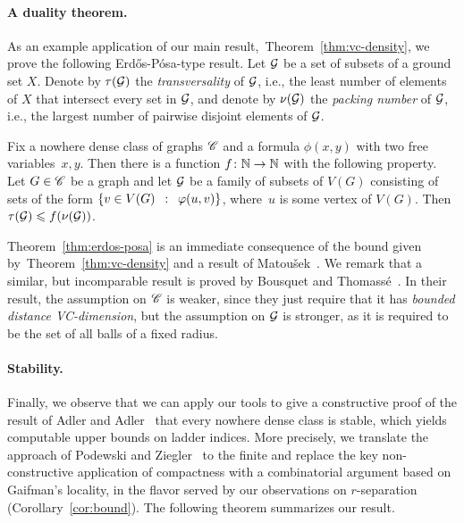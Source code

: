 \paragraph{A duality theorem.}
As an example application of our main
result,~Theorem~\ref{thm:vc-density}, we prove the following
Erd\H{o}s-P\'{o}sa-type result. Let $\cal G$ be a set of subsets of a
ground set $X$. Denote by $\tau(\cal G)$ the \emph{transversality} of
$\cal G$, i.e., the least number of elements of $X$ that intersect
every set in $\cal G$, and denote by $\nu(\cal G)$ the \emph{packing
  number} of $\cal G$, i.e., the largest number of pairwise disjoint
elements of $\cal G$.
 
\setcounter{ep}{\value{theorem}}
\begin{theorem}\label{thm:erdos-posa}
  Fix a nowhere dense class of graphs $\CCC$ and a formula $\phi(x,y)$
  with two free variables~$x,y$.  Then there is a function
  $f\from \N\to\N$ with the following property.  Let $G\in \CCC$ be a
  graph and let $\cal G$ be a family of subsets of $V(G)$ consisting
  of sets of the form $\setof{v\in V(G)}{\phi(u, v)}$, where~$u$ is
  some vertex of $V(G)$.  Then~$\tau({\cal G})\le f(\nu(\cal G))$.
\end{theorem}

Theorem~\ref{thm:erdos-posa} is an immediate consequence of the bound
given by~Theorem~\ref{thm:vc-density} and a result of Matou{\v
  s}ek~\cite{Matousek:2004:BVI:1005787.1005789}.  We remark that a
similar, but incomparable result is proved by Bousquet and
Thomass{\'e}~\cite{BousquetT15}.  In their result, the assumption on
$\CCC$ is weaker, since they just require that it has \emph{bounded
  distance VC-dimension}, but the assumption on $\cal G$ is stronger,
as it is required to be the set of all balls of a fixed radius.





\paragraph{Stability.}
Finally, we observe that we can apply our tools to give a constructive
proof of the result of Adler and Adler~\cite{adler2014interpreting}
that every nowhere dense class is stable, which yields computable
upper bounds on ladder indices.  More precisely, we translate the
approach of Podewski and Ziegler~\cite{podewski1978stable} to the
finite and replace the key non-constructive application of compactness
with a combinatorial argument based on Gaifman's locality, in the
flavor served by our observations on $r$-separation
(Corollary~\ref{cor:bound}).  The following theorem summarizes our
result.

